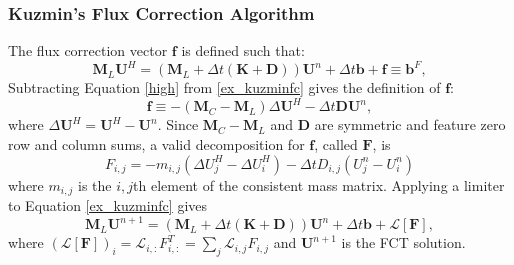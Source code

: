 \subsubsection{Kuzmin's Flux Correction Algorithm}
The flux correction vector $\mathbf{f}$ is defined such that:
\begin{equation}\label{ex_kuzminfc}
   \mathbf{M}_L\mathbf{U}^H
      = (\mathbf{M}_L + \Delta t(\mathbf{K} + \mathbf{D}))\mathbf{U}^n
         + \Delta t\mathbf{b} + \mathbf{f} \equiv \mathbf{b}^F,
\end{equation}
Subtracting Equation \ref{high} from \ref{ex_kuzminfc} gives the definition of
$\mathbf{f}$:
\begin{equation}\label{ex_kuzminFdef}
   \mathbf{f} \equiv -(\mathbf{M}_C-\mathbf{M}_L)\Delta\mathbf{U}^H
      -\Delta t\mathbf{D}\mathbf{U}^n,
\end{equation}
where $\Delta\mathbf{U}^H = \mathbf{U}^H - \mathbf{U}^n$. Since
$\mathbf{M}_C-\mathbf{M}_L$ and $\mathbf{D}$ are symmetric
and feature zero row and column sums, a valid decomposition for $\mathbf{f}$,
called $\mathbf{F}$, is
\begin{equation}
   F_{i,j} = -m_{i,j}(\Delta U^H_j - \Delta U^H_i) - \Delta t D_{i,j}(U^n_j - U^n_i)
\end{equation}
where $m_{i,j}$ is the $i,j$th element of the consistent mass matrix.
Applying a limiter to Equation \ref{ex_kuzminfc} gives
\begin{equation}\label{ex_limited}
   \mathbf{M}_L\mathbf{U}^{n+1}
      = (\mathbf{M}_L + \Delta t(\mathbf{K} + \mathbf{D}))\mathbf{U}^n
         + \Delta t\mathbf{b} + \mathcal{L}[\mathbf{F}],
\end{equation}
where $(\mathcal{L}[\mathbf{F}])_i = \mathcal{L}_{i,:}F_{i,:}^T
= \sum\limits_j \mathcal{L}_{i,j}F_{i,j}$ and $\mathbf{U}^{n+1}$ is the FCT solution.


